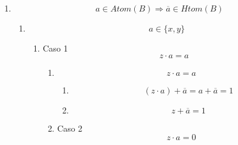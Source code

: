 \begin{enumerate}
\begin{enumerate}
\begin{enumerate}
\begin{enumerate}
\begin{enumerate}
\begin{enumerate}
            \begin{enumerate}
            \def\labelenumvii{\arabic{enumvii}.}
            \tightlist
            \item
              \[{{{({z + a})} \cdot \overline{a}} = {1 \cdot \overline{a}}} = \overline{a}\]
            \item
              \[{z \cdot \overline{a}} = \overline{a}\]
            \end{enumerate}
          \end{enumerate}
        \end{enumerate}
      \item
        \[{a \in \mathit{Atom}}{(B)}\Rightarrow{\overline{a} \in \mathit{Htom}}{(B)}\]

        \begin{enumerate}
        \def\labelenumv{\arabic{enumv}.}
        \item
          \[a \in {\{{x,y}\}}\]

          \begin{enumerate}
          \def\labelenumvi{\arabic{enumvi}.}
          \item
            Caso 1 \[{z \cdot a} = a\]

            \begin{enumerate}
            \def\labelenumvii{\arabic{enumvii}.}
            \item
              \[{z \cdot a} = a\]

              \begin{enumerate}
              \def\labelenumviii{\arabic{enumviii}.}
              \tightlist
              \item
                \[{{{({z \cdot a})} + \overline{a}} = {a + \overline{a}}} = 1\]
              \item
                \[{z + \overline{a}} = 1\]
              \end{enumerate}
            \item
              Caso 2 \[{z \cdot a} = 0\]


\end{enumerate}
\end{enumerate}
\end{enumerate}
\end{enumerate}
\end{enumerate}
\end{enumerate}
\end{enumerate}
